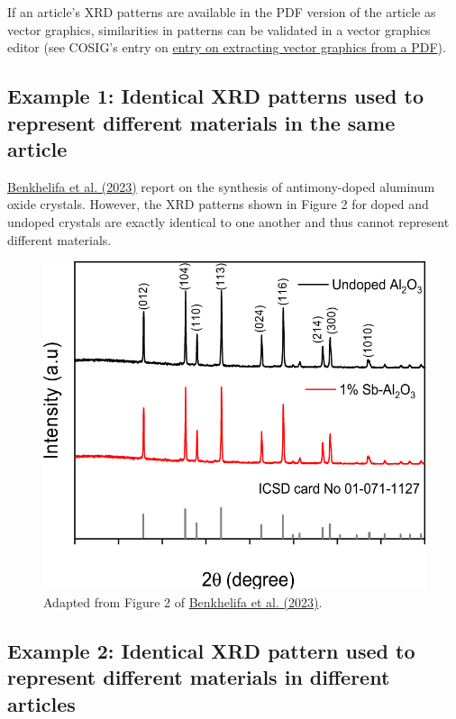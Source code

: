 \documentclass[letterpaper, 12pt]{article}
\begin{document}
If an article's XRD patterns are available in the PDF version of the article as vector graphics, similarities in patterns can be validated in a vector graphics editor (see COSIG's entry on \href{https://osf.io/n8fvw}{entry on extracting vector graphics from a PDF}).

\subsection*{Example 1: Identical XRD patterns used to represent different materials in the same article}

\href{https://doi.org/10.1007/s10971-023-06078-x}{Benkhelifa et al. (2023)} report on the synthesis of antimony-doped aluminum oxide crystals. However, the XRD patterns shown in Figure 2 for doped and undoped crystals are exactly identical to one another and thus cannot represent different materials.

\begin{figure}[h!tbp]
    \centering
    \includegraphics[width=\textwidth]{img/xrd_data_duplication/benkhelifa_figure_2.png}
    \caption*{Adapted from Figure 2 of \href{https://doi.org/10.1007/s10971-023-06078-x}{Benkhelifa et al. (2023)}.}
\end{figure}

\pagebreak

\subsection*{Example 2: Identical XRD pattern used to represent different materials in different articles}
\end{document}
